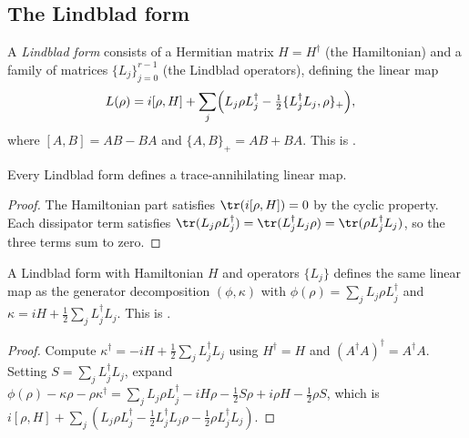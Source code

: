 \subsection{The Lindblad form}

\begin{definition}\label{def:lindblad_form}
    \leanok
    A \emph{Lindblad form} consists of a Hermitian matrix $H = H^\dagger$
    (the Hamiltonian) and a family of matrices $\{L_j\}_{j=0}^{r-1}$
    (the Lindblad operators), defining the linear map
    \begin{align}
        L(\rho)
        &= i[\rho,H]
        + \sum_j \Bigl(        L_j\rho L_j^\dagger
            - \tfrac{1}{2}\{L_j^\dagger L_j,\rho\}_+
        \Bigr),
        \label{eq:semigroup_lindblad_form}
    \end{align}
    where $[A,B] = AB - BA$ and $\{A,B\}_+ = AB + BA$.
    This is \cite[Equation~(7.21)]{Wolf2012Quantum}.
\end{definition}

\begin{theorem}
    \label{thm:lindbladForm_isTraceAnnihilating}
    \leanok
    Every Lindblad form defines a trace-annihilating linear map.
\end{theorem}

\begin{proof}
    \leanok
    The Hamiltonian part satisfies
    $\tr(i[\rho,H]) = 0$ by the cyclic property.
    Each dissipator term satisfies
    $\tr(L_j\rho L_j^\dagger)
        = \tr(L_j^\dagger L_j\rho)
        = \tr(\rho L_j^\dagger L_j)$,
    so the three terms sum to zero.
\end{proof}

\begin{theorem}
    \label{thm:lindbladForm_eq_generatorDecomp}
    \leanok
    A Lindblad form with Hamiltonian $H$ and operators $\{L_j\}$ defines
    the same linear map as the generator decomposition $(\phi,\kappa)$
    with $\phi(\rho) = \sum_j L_j\rho L_j^\dagger$ and
    $\kappa = iH + \frac{1}{2}\sum_j L_j^\dagger L_j$.
    This is \cite[Equation~(7.24)]{Wolf2012Quantum}.
\end{theorem}

\begin{proof}
    \leanok
    Compute $\kappa^\dagger = -iH+\frac{1}{2}\sum_j L_j^\dagger L_j$
    using $H^\dagger = H$ and $(A^\dagger A)^\dagger = A^\dagger A$.
    Setting $S = \sum_j L_j^\dagger L_j$, expand
    $\phi(\rho)-\kappa\rho-\rho\kappa^\dagger
        = \sum_j L_j\rho L_j^\dagger-iH\rho-\tfrac{1}{2}S\rho
        +i\rho H-\tfrac{1}{2}\rho S$,
    which is
    $i[\rho,H]+\sum_j(L_j\rho L_j^\dagger
        -\tfrac{1}{2}L_j^\dagger L_j\rho
        -\tfrac{1}{2}\rho L_j^\dagger L_j)$.
\end{proof}

